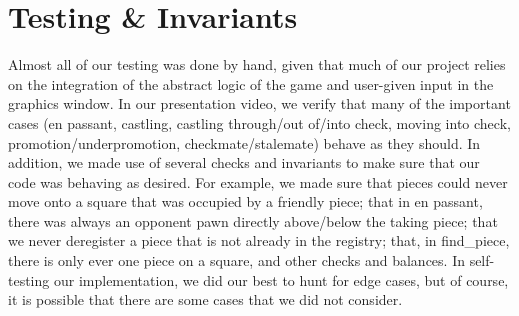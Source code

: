 \documentclass{article}
\begin{document}
\section{Testing \& Invariants}
Almost all of our testing was done by hand, given that much of our project relies on the integration of the abstract logic of the game and user-given input in the graphics window. In our presentation video, we verify that many of the important cases (en passant, castling, castling through/out of/into check, moving into check, promotion/underpromotion, checkmate/stalemate) behave as they should. In addition, we made use of several checks and invariants to make sure that our code was behaving as desired. For example, we made sure that pieces could never move onto a square that was occupied by a friendly piece; that in en passant, there was always an opponent pawn directly above/below the taking piece; that we never deregister a piece that is not already in the registry; that, in find\_piece, there is only ever one piece on a square, and other checks and balances. In self-testing our implementation, we did our best to hunt for edge cases, but of course, it is possible that there are some cases that we did not consider.
\end{document}
